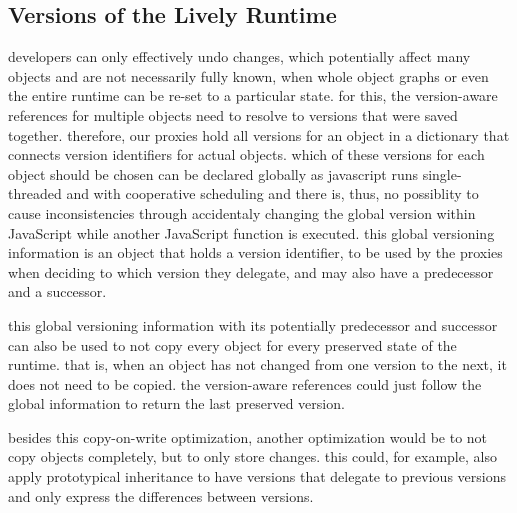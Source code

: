 \subsection{Versions of the Lively Runtime}

developers can only effectively undo changes, which potentially affect many objects and are not necessarily fully known, when whole object graphs or even the entire runtime can be re-set to a particular state.
for this, the version-aware references for multiple objects need to resolve to versions that were saved together.
therefore, our proxies hold all versions for an object in a dictionary that connects version identifiers for actual objects.
which of these versions for each object should be chosen can be declared globally as javascript runs single-threaded and with cooperative scheduling and there is, thus, no possiblity to cause inconsistencies through accidentaly changing the global version within JavaScript while another JavaScript function is executed.
this global versioning information is an object that holds a version identifier, to be used by the proxies when deciding to which version they delegate, and may also have a predecessor and a successor.

this global versioning information with its potentially predecessor and successor can also be used to not copy every object for every preserved state of the runtime.
that is, when an object has not changed from one version to the next, it does not need to be copied.
the version-aware references could just follow the global information to return the last preserved version.

besides this copy-on-write optimization, another optimization would be to not copy objects completely, but to only store changes.
this could, for example, also apply prototypical inheritance to have versions that delegate to previous versions and only express the differences between versions.

